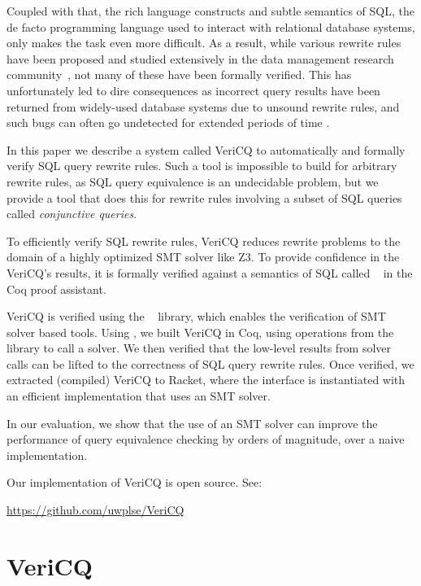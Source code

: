 Coupled with that, the rich language constructs and subtle semantics of
SQL, the de facto programming language used to interact with relational 
database systems, 
only makes the task even more difficult.
As a result, while various rewrite rules
have been proposed and studied extensively 
in the data management research community~\cite{MumickFPR90SIGMOD, Muralikrishna92VLDB, LevyMS94VLDB, SeshadriHPLRSSS96SIGMOD},
not many of these have been formally verified. This has unfortunately 
led to dire consequences as incorrect query results have been returned 
from widely-used database systems due to unsound rewrite rules, and 
such bugs can often go undetected for extended periods of time
\cite{GanskiW87SIGMOD, MySQLBug, PostgresBug}.

In this paper we describe a system called VeriCQ to automatically and formally verify SQL query rewrite rules.
Such a tool is impossible to build for arbitrary rewrite rules, as SQL query equivalence is an 
undecidable problem, but we provide a tool that does this for rewrite rules involving 
a subset of SQL queries called \emph{conjunctive queries}.

To efficiently verify SQL rewrite rules, VeriCQ reduces rewrite problems to the domain of
a highly optimized SMT solver like Z3.
%
To provide confidence in the VeriCQ's results, it is formally verified against a semantics of
SQL called \sem~\cite{hottsql} in the Coq proof assistant. 

VeriCQ is verified using the \SpaceSearch~\cite{SpaceSearch} library, which enables the verification of 
SMT solver based tools. 
%
Using \SpaceSearch, we built VeriCQ in Coq, using operations from the
\SpaceSearch library to call a solver.
%
We then verified that the low-level results from solver calls can
be lifted to the correctness of SQL query rewrite rules.
%
Once verified, we extracted (compiled) VeriCQ to Racket,
where the \SpaceSearch interface is instantiated with an efficient
implementation that uses an SMT solver.

In our evaluation, we show that the use of an SMT
solver can improve the performance of query equivalence checking by
orders of magnitude, over a naive implementation.

Our implementation of VeriCQ is open source. See:

\url{https://github.com/uwplse/VeriCQ}


\section{VeriCQ}

